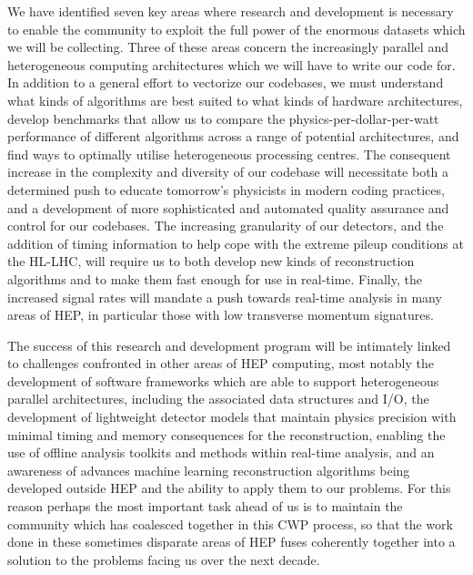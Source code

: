 We have identified seven key areas where research and development is necessary to enable the community to exploit the full power of the enormous datasets which we will be collecting. Three of these 
areas concern the increasingly parallel and heterogeneous computing architectures which we will have to write our code for. In addition to a general effort to vectorize our codebases, we must understand 
what kinds of algorithms are best suited to what kinds of hardware architectures, develop benchmarks that allow us to compare the physics-per-dollar-per-watt performance of different algorithms across a 
range of potential architectures, and find ways to optimally utilise heterogeneous processing centres. The consequent increase in the complexity and diversity of our codebase will necessitate both a 
determined push to educate tomorrow’s physicists in modern coding practices, and a development of more sophisticated and automated quality assurance and control for our codebases. The increasing granularity 
of our detectors, and the addition of timing information to help cope with the extreme pileup conditions at the HL-LHC, will require us to both develop new kinds of reconstruction algorithms 
and to make them fast enough for use in real-time. Finally, the increased signal rates will mandate a push towards real-time analysis in many areas of HEP, in particular those with low transverse momentum 
signatures.

The success of this research and development program will be intimately linked to challenges confronted in other areas of HEP computing, most notably the development of software frameworks which are able 
to support heterogeneous parallel architectures, including the associated data structures and I/O, the development of lightweight detector models that maintain physics precision with minimal timing and 
memory consequences for the reconstruction, enabling the use of offline analysis toolkits and methods within real-time analysis, and an awareness of advances machine learning reconstruction algorithms 
being developed outside HEP and the ability to apply them to our problems. For this reason perhaps the most important task ahead of us is to maintain the community which has coalesced together in this 
CWP process, so that the work done in these sometimes disparate areas of HEP fuses coherently together into a solution to the problems facing us over the next decade.


 

